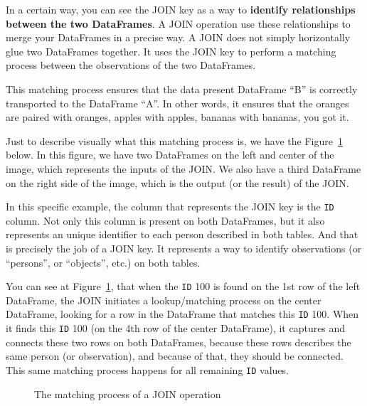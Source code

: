 \documentclass[
  11pt,
  letterpaper,
  DIV=11,
  numbers=noendperiod]{scrreprt}
\begin{document}
In a certain way, you can see the JOIN key as a way to \textbf{identify
relationships between the two DataFrames}. A JOIN operation use these
relationships to merge your DataFrames in a precise way. A JOIN does not
simply horizontally glue two DataFrames together. It uses the JOIN key
to perform a matching process between the observations of the two
DataFrames.

This matching process ensures that the data present DataFrame ``B'' is
correctly transported to the DataFrame ``A''. In other words, it ensures
that the oranges are paired with oranges, apples with apples, bananas
with bananas, you got it.

Just to describe visually what this matching process is, we have the
Figure~\ref{fig-join-matching} below. In this figure, we have two
DataFrames on the left and center of the image, which represents the
inputs of the JOIN. We also have a third DataFrame on the right side of
the image, which is the output (or the result) of the JOIN.

In this specific example, the column that represents the JOIN key is the
\texttt{ID} column. Not only this column is present on both DataFrames,
but it also represents an unique identifier to each person described in
both tables. And that is precisely the job of a JOIN key. It represents
a way to identify observations (or ``persons'', or ``objects'', etc.) on
both tables.

You can see at Figure~\ref{fig-join-matching}, that when the \texttt{ID}
100 is found on the 1st row of the left DataFrame, the JOIN initiates a
lookup/matching process on the center DataFrame, looking for a row in
the DataFrame that matches this \texttt{ID} 100. When it finds this
\texttt{ID} 100 (on the 4th row of the center DataFrame), it captures
and connects these two rows on both DataFrames, because these rows
describes the same person (or observation), and because of that, they
should be connected. This same matching process happens for all
remaining \texttt{ID} values.

\begin{figure}


\caption{\label{fig-join-matching}The matching process of a JOIN
operation}

\end{figure}%
\end{document}
